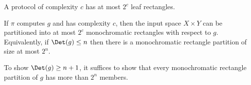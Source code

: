 \begin{lemma}
  \label{lem:leaf_card}
  \leanok
  A protocol of complexity $c$ has at most $2^c$ leaf rectangles.
\end{lemma}

\begin{theorem}
  \label{thm:rect_partition}
  \leanok
  If $\pi$ computes $g$ and has complexity $c$, then the input space $X \times Y$
  can be partitioned into at most $2^c$ monochromatic rectangles with respect to $g$.
  Equivalently, if $\Det(g) \le n$ then there is a monochromatic rectangle
  partition of size at most $2^n$.
\end{theorem}

\begin{theorem}
  \label{thm:rect_lower_bound}
  \leanok
  To show $\Det(g) \ge n+1$, it suffices to show that every monochromatic
  rectangle partition of $g$ has more than $2^n$ members.
\end{theorem}
